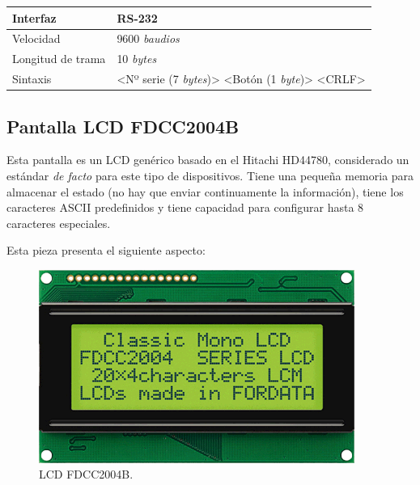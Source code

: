 \smallskip

\begin{center}
	\begin{tabular}{|l|l|}
		\hline Interfaz & RS-232 \\
		\hline Velocidad & 9600 \textit{baudios} \\ 
		\hline Longitud de trama & 10 \textit{bytes} \\ 
		\hline Sintaxis & <Nº serie (7 \textit{bytes})> <Botón (1 \textit{byte})> <CRLF> \\ 
		\hline 
	\end{tabular}
	\smallskip
\end{center}

\smallskip

\subsection{Pantalla LCD FDCC2004B}

Esta pantalla es un LCD genérico basado en el Hitachi HD44780, considerado un estándar \textit{de facto} para este tipo de dispositivos. Tiene una pequeña memoria para almacenar el estado (no hay que enviar continuamente la información), tiene los caracteres ASCII predefinidos y tiene capacidad para configurar hasta 8 caracteres especiales.

Esta pieza presenta el siguiente aspecto:

\smallskip

\begin{figure}[H]
	\noindent \begin{centering}
		\includegraphics[width=\linewidth/2]{capitulo3/FDCC2004B}
		\par\end{centering}
	\smallskip
	\caption{\label{fig:FDCC2004B} LCD FDCC2004B.}
\end{figure} 

